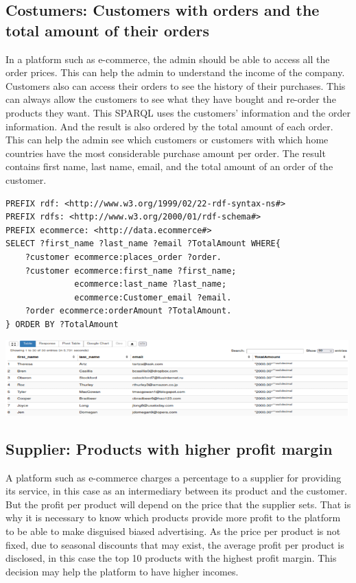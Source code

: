 \documentclass{article}
\begin{document}
\subsection{Costumers: Customers with orders and the total amount of their orders}
In a platform such as e-commerce, the admin should be able to access all the order prices. This can help the admin to understand the income of the company. Customers also can access their orders to see the history of their purchases. This can always allow the customers to see what they have bought and re-order the products they want. This SPARQL uses the customers' information and the order information. And the result is also ordered by the total amount of each order. This can help the admin see which customers or customers with which home countries have the most considerable purchase amount per order. The result contains first name, last name, email, and the total amount of an order of the customer.

\begin{lstlisting}[breaklines, frame=single]
PREFIX rdf: <http://www.w3.org/1999/02/22-rdf-syntax-ns#>
PREFIX rdfs: <http://www.w3.org/2000/01/rdf-schema#>
PREFIX ecommerce: <http://data.ecommerce#>
SELECT ?first_name ?last_name ?email ?TotalAmount WHERE{
	?customer ecommerce:places_order ?order.
	?customer ecommerce:first_name ?first_name;
			  ecommerce:last_name ?last_name;
			  ecommerce:Customer_email ?email.
	?order ecommerce:orderAmount ?TotalAmount.
} ORDER BY ?TotalAmount
\end{lstlisting}

\begin{center}
   \includegraphics[scale=0.6]{OISreport-costumer-query2.png}
\end{center}


\subsection{Supplier: Products with higher profit margin}
A platform such as e-commerce charges a percentage to a supplier for providing its service, in this case as an intermediary between its product and the customer. But the profit per product will depend on the price that the supplier sets. That is why it is necessary to know which products provide more profit to the platform to be able to make disguised biased advertising. As the price per product is not fixed, due to seasonal discounts that may exist, the average profit per product is disclosed, in this case the top 10 products with the highest profit margin. This decision may help the platform to have higher incomes. \\
\end{document}

